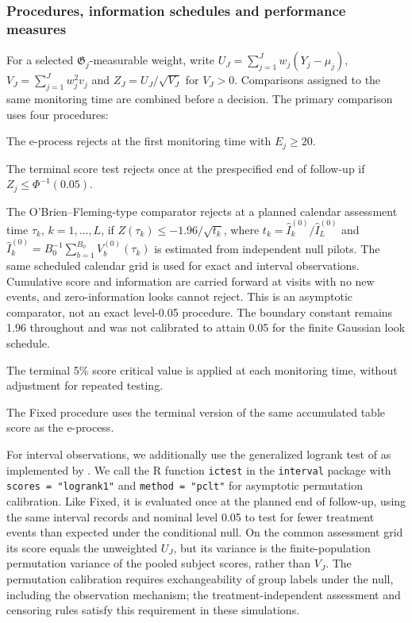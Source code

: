 \documentclass[12pt]{article}
\theoremstyle{definition}
\theoremstyle{remark}
\begin{document}
\subsubsection{Procedures, information schedules and performance measures}
For a selected $\mathfrak G_j$-measurable weight, write $U_J=\sum_{j=1}^{J}w_j(Y_j-\mu_j)$, $V_J=\sum_{j=1}^{J}w_j^2v_j$ and $Z_J=U_J/\sqrt{V_J}$ for $V_J>0$. Comparisons assigned to the same monitoring time are combined before a decision. The primary comparison uses four procedures:
\begin{description}[style=multiline,leftmargin=6em,labelwidth=5em]
\item[$E$] The e-process rejects at the first monitoring time with $E_j\geq20$.
\item[Fixed] The terminal score test rejects once at the prespecified end of follow-up if $Z_j\leq\Phi^{-1}(0.05)$.
\item[OBF] The O'Brien--Fleming-type comparator rejects at a planned calendar assessment time $\tau_k$, $k=1,\ldots,L$, if $Z(\tau_k)\leq-1.96/\sqrt{t_k}$, where $t_k=\widehat I_k^{(0)}/\widehat I_L^{(0)}$ and $\widehat I_k^{(0)}=B_0^{-1}\sum_{b=1}^{B_0}V_b^{(0)}(\tau_k)$ is estimated from independent null pilots. The same scheduled calendar grid is used for exact and interval observations. Cumulative score and information are carried forward at visits with no new events, and zero-information looks cannot reject. This is an asymptotic comparator, not an exact level-0.05 procedure. The boundary constant remains 1.96 throughout and was not calibrated to attain 0.05 for the finite Gaussian look schedule.
\item[Repeated] The terminal 5\% score critical value is applied at each monitoring time, without adjustment for repeated testing.
\end{description}

The Fixed procedure uses the terminal version of the same accumulated table score as the e-process.

For interval observations, we additionally use the generalized logrank test of \citet{Sun1996} as implemented by \citet{FayShaw2010}. We call the R function \texttt{ictest} in the \texttt{interval} package with \texttt{scores = "logrank1"} and \texttt{method = "pclt"} for asymptotic permutation calibration. Like Fixed, it is evaluated once at the planned end of follow-up, using the same interval records and nominal level 0.05 to test for fewer treatment events than expected under the conditional null. On the common assessment grid its score equals the unweighted $U_J$, but its variance is the finite-population permutation variance of the pooled subject scores, rather than $V_J$. The permutation calibration requires exchangeability of group labels under the null, including the observation mechanism; the treatment-independent assessment and censoring rules satisfy this requirement in these simulations.
\end{document}

